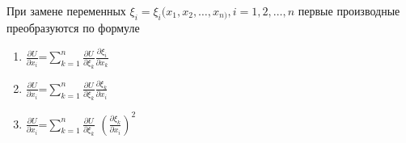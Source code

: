 При замене переменных \(\xi _i=\xi _i(x_1,x_2,\dots ,x_{n)} , i=1,2,\dots , n\) первые производные преобразуются по формуле

\begin{enumerate}[label=\arabic*)]
    \item \(\frac{\partial U}{\partial x_i}\)=\(\sum_{k=1}^{n} \frac{\partial U}{\partial \xi _k}\frac{\partial \xi _i}{\partial x_k}\)
    \item \(\frac{\partial U}{\partial x_i}\)=\(\sum_{k=1}^{n} \frac{\partial U}{\partial \xi _k}\frac{\partial \xi _k}{\partial x_i}\)
    \item \(\frac{\partial U}{\partial x_i}\)=\(\sum_{k=1}^{n} \frac{\partial U}{\partial \xi _k}\) \(\left(\frac{\partial \xi _k}{\partial x_i}\right)^2\)
\end{enumerate}

